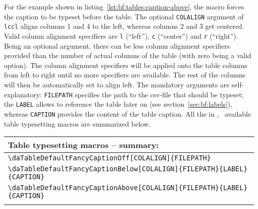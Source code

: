 		\newpage
		For the example shown in \mbox{listing \ref{lst:bf:tables:caption-above}}, the macro \daListingInline{\\daTableDefaultFancyCaptionAbove}\newline
		forces the caption to be typeset before the table. The optional \lstinline{COLALIGN} argument of \lstinline{lccl} aligns columns 1 and 4 to the left, whereas columns 2 and 3 get centered. Valid column alignment specifiers are \lstinline{l} (\enquote{left}), \lstinline{c} (\enquote{center}) and \lstinline{r} (\enquote{right}). Being an optional argument, there can be less column alignment specifiers provided than the number of actual columns of the table (with zero being a valid option). The column alignment specifiers will be applied onto the table columns from left to right until no more specifiers are available. The rest of the columns will then be automatically set to align left. 
		\newline The mandatory arguments are self-explanatory: \lstinline{FILEPATH} specifies the path to the \mbox{csv-file} that should be typeset; the \lstinline{LABEL} allows to reference the table later on (see \mbox{section \ref{sec:bf:labels}}), whereas \lstinline{CAPTION} provides the content of the table caption. 
		\newline All the in \productName, \productVersion~available table typesetting macros are summarized below.
		
		\begin{longtable}[c]{l}
			\rowcolor{white}
			\textbf{Table typesetting macros -- summary:}\\
			\midrule
			\endfirsthead
			\lstinline$\daTableDefaultFancyCaptionOff[COLALIGN]{FILEPATH}$\\
			\lstinline$\daTableDefaultFancyCaptionBelow[COLALIGN]{FILEPATH}{LABEL}{CAPTION}$\\
			\lstinline$\daTableDefaultFancyCaptionAbove[COLALIGN]{FILEPATH}{LABEL}{CAPTION}$\\
			\midrule
			\rowcolor{white}
			\multicolumn{1}{c}{\small Valid options for \lstinline$COLALIGN$: \lstinline$l$ (\enquote{left}), \lstinline$c$ (\enquote{center}), \lstinline$r$ (\enquote{right}).}
		\end{longtable}
		
